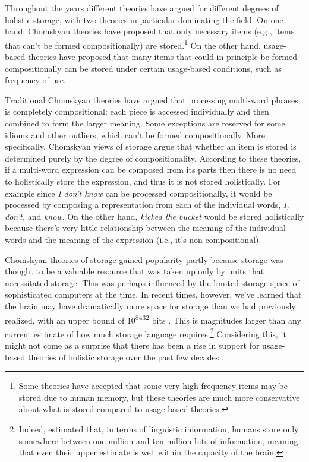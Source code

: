 \documentclass[
  authoryear,
  preprint,
  1p,
  onecolumn]{elsarticle}
\begin{document}
Throughout the years different theories have argued for different
degrees of holistic storage, with two theories in particular dominating
the field. On one hand, Chomskyan theories
\citep[e.g.,][]{chomskyAspectsTheorySyntax1965, pinkerFutureTense2002}
have proposed that only necessary items (e.g., items that can't be
formed compositionally) are stored.\footnote{Some theories
  \citep[e.g.,][]{pinkerFutureTense2002} have accepted that some very
  high-frequency items may be stored due to human memory, but these
  theories are much more conservative about what is stored compared to
  usage-based theories.} On the other hand, usage-based theories
\citep[e.g.,][]{bybee2003} have proposed that many items that could in
principle be formed compositionally can be stored under certain
usage-based conditions, such as frequency of use.

Traditional Chomskyan theories
\citep[e.g.,][]{chomskyAspectsTheorySyntax1965, pinkerFutureTense2002}
have argued that processing multi-word phrases is completely
compositional: each piece is accessed individually and then combined to
form the larger meaning. Some exceptions are reserved for some idioms
and other outliers, which can't be formed compositionally. More
specifically, Chomskyan views of storage argue that whether an item is
stored is determined purely by the degree of compositionality. According
to these theories, if a multi-word expression can be composed from its
parts then there is no need to holistically store the expression, and
thus it is not stored holistically. For example since \emph{I don't
know} can be processed compositionally, it would be processed by
composing a representation from each of the individual words, \emph{I,
don't,} and \emph{know}. On the other hand, \emph{kicked the bucket}
would be stored holistically because there's very little relationship
between the meaning of the individual words and the meaning of the
expression (i.e., it's non-compositional).

Chomskyan theories of storage gained popularity partly because storage
was thought to be a valuable resource that was taken up only by units
that necessitated storage. This was perhaps influenced by the limited
storage space of sophisticated computers at the time. In recent times,
however, we've learned that the brain may have dramatically more space
for storage than we had previously realized, with an upper bound of
10\textsuperscript{8432} bits \citep{wang2003}. This is magnitudes
larger than any current estimate of how much storage language
requires.\footnote{Indeed, \citet{mollica2019} estimated that, in terms
  of linguistic information, humans store only somewhere between one
  million and ten million bits of information, meaning that even their
  upper estimate is well within the capacity of the brain.} Considering
this, it might not come as a surprise that there has been a rise in
support for usage-based theories of holistic storage over the past few
decades
\citep{kapatsinski2009, kapatsinski2018, stembergerFrequencyLexicalStorage1986, stemberger2004, morgan2016, bybee1999, bybee2001, bybee2002, bybee2003, baayenDutchInflectionRules2002, ambridgeStoredAbstractionsRadical2020, zangParafovealProcessingChinese2024}.
\end{document}
